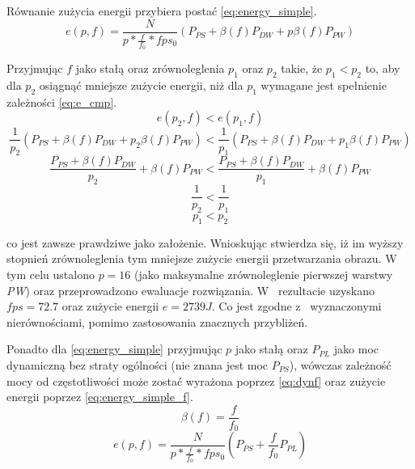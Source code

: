 Równanie zużycia energii przybiera postać \eqref{eq:energy_simple}.
\begin{equation}
e(p,f) = \frac{N}{p*\frac{f}{f_0}* fps_0}(P_{PS} + \beta (f) P_{DW} + p \beta (f) P_{PW})
\label{eq:energy_simple}
\end{equation}


Przyjmując $f$ jako stałą oraz zrównoleglenia $p_1$ oraz $p_2$ takie, że $p_1 < p_2$ 
to, aby dla $p_2$ osiągnąć mniejsze zużycie energii, niż dla $p_1$ wymagane jest spełnienie zależności \eqref{eq:e_cmp}.
\begin{equation}
e(p_2, f) < e(p_1, f)
\label{eq:e_cmp}
\end{equation}
\begin{equation}
\frac{1}{p_2}(P_{PS} + \beta(f) P_{DW} + p_2 \beta(f) P_{PW}) < 
\frac{1}{p_1}(P_{PS} + \beta(f) P_{DW} + p_1 \beta(f) P_{PW})
\end{equation}
\begin{equation}
\frac{P_{PS} + \beta(f) P_{DW}}{p_2} + \beta(f) P_{PW} < 
\frac{P_{PS} + \beta(f) P_{DW}}{p_1} + \beta(f) P_{PW}
\end{equation}
\begin{equation}
\frac{1}{p_2} < \frac{1}{p_1}
\end{equation}
\begin{equation}
p_1 < p_2
\end{equation}

 co jest zawsze prawdziwe jako założenie. 
 Wnioskując stwierdza się, iż im wyższy stopnień zrównoleglenia tym mniejsze zużycie energii przetwarzania obrazu.
 W~ tym celu ustalono $p = 16$ (jako maksymalne zrównoleglenie pierwszej warstwy \emph{PW}) oraz przeprowadzono ewaluacje rozwiązania.
 W~ rezultacie uzyskano $fps = 72.7$ oraz zużycie energii $e = 2739 J$.
 Co jest zgodne z~ wyznaczonymi nierównościami, pomimo zastosowania znacznych przybliżeń.
 
 Ponadto dla \eqref{eq:energy_simple} przyjmując $p$ jako stałą oraz  $P_{PL}$ jako moc dynamiczną bez straty ogólności (nie znana jest moc $P_{PS}$), wówczas zależność mocy od częstotliwości może zostać wyrażona poprzez \eqref{eq:dynf} \cite{dynamic_power} oraz zużycie energii poprzez \eqref{eq:energy_simple_f}. 
\begin{equation}
\beta(f) = \frac{f}{f_0}
\label{eq:dynf}
\end{equation} 
\begin{equation}
e(p,f) = \frac{N}{p*\frac{f}{f_0}* fps_0}(P_{PS} + \frac{f}{f_0} P_{PL})
\label{eq:energy_simple_f}
\end{equation}

